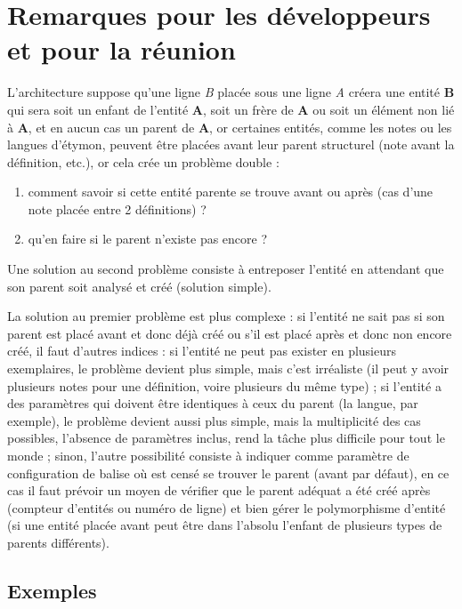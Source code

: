 \documentclass[10pt]{report}
\begin{document}
\chapter{Remarques pour les développeurs et pour la réunion}

L’architecture suppose qu’une ligne \textit{B} placée sous une ligne \textit{A} créera une entité \textbf{B} qui sera soit un enfant de l’entité \textbf{A}, soit un frère de \textbf{A} ou soit un élément non lié à \textbf{A}, et en aucun cas un parent de \textbf{A}, or certaines entités, comme les notes ou les langues d’étymon, peuvent être placées avant leur parent structurel (note avant la définition, etc.), or cela crée un problème double : 
\begin{enumerate}
	\item comment savoir si cette entité parente se trouve avant ou après (cas d’une note placée entre 2 définitions) ?
	\item qu’en faire si le parent n’existe pas encore ?
\end{enumerate}

Une solution au second problème consiste à entreposer l’entité en attendant que son parent soit analysé et créé (solution simple).

La solution au premier problème est plus complexe : si l’entité ne sait pas si son parent est placé avant et donc déjà créé ou s’il est placé après et donc non encore créé, il faut d’autres indices : si l’entité ne peut pas exister en plusieurs exemplaires, le problème devient plus simple, mais c’est irréaliste (il peut y avoir plusieurs notes pour une définition, voire plusieurs du même type) ; si l’entité a des paramètres qui doivent être identiques à ceux du parent (la langue, par exemple), le problème devient aussi plus simple, mais la multiplicité des cas possibles, l’absence de paramètres inclus, rend la tâche plus difficile pour tout le monde ; sinon, l’autre possibilité consiste à indiquer comme paramètre de configuration de balise où est censé se trouver le parent (avant par défaut), en ce cas il faut prévoir un moyen de vérifier que le parent adéquat a été créé après (compteur d’entités ou numéro de ligne) et bien gérer le polymorphisme d’entité (si une entité placée avant peut être dans l’absolu l’enfant de plusieurs types de parents différents).

\section*{Exemples}
\end{document}

